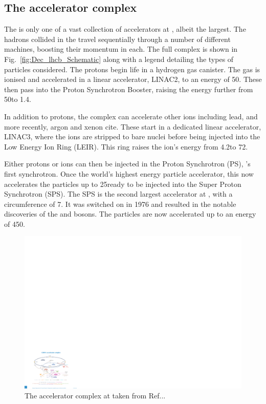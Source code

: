\subsection{The accelerator complex}

The \lhc is only one of a vast collection of accelerators at \cern, albeit the largest. The hadrons collided in the \lhc travel sequentially through a number of different machines, boosting their momentum in each. The full complex is shown in Fig.~\ref{fig:Dec_lhcb_Schematic} along with a legend detailing the types of particles considered. The protons begin life in a hydrogen gas canister. The gas is ionised and accelerated in  a linear accelerator, LINAC2, to an energy of 50\mev. These then pass into the Proton Synchrotron Booster, raising the energy further from 50\mev to 1.4\gev. 

In addition to protons, the complex can accelerate other ions including lead, and more recently, argon and xenon {\color{Red}cite}. These start in a dedicated linear accelerator, LINAC3, where the ions are stripped to bare nuclei before being injected into the Low Energy Ion Ring (LEIR). This ring raises the ion's energy from 4.2\mev to 72\mev. 

Either protons or ions can then be injected in the Proton Synchrotron (PS), \cern's first synchrotron. Once the world's highest energy particle accelerator, this now accelerates the particles up to 25\gev ready to be injected into the Super Proton Synchrotron (SPS).
The SPS is the second largest accelerator at \cern, with a circumference of 7\km. It was switched on in 1976 and resulted in the notable discoveries of the \Z and \W bosons. The particles are now accelerated up to an energy of 450\gev. 

\begin{figure}[!h]
    \centering
    \includegraphics[width=1.0\textwidth]{figs/Detector/Acc_complex.pdf}
    \caption{The accelerator complex at \cern taken from Ref...}
    \label{fig:Dec_Acc_Complex}   
\end{figure}



